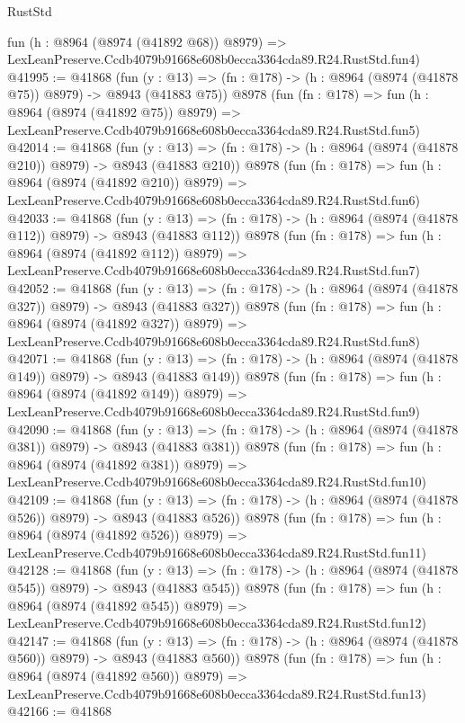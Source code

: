 \begin{lexlean}{RustStd}
\begin{coremodule}
    fun (h : @8964 (@8974 (@41892 @68)) @8979) =>
    LexLeanPreserve.Ccdb4079b91668e608b0ecca3364cda89.R24.RustStd.fun4)
@41995 := @41868
    (fun (y : @13) => (fn : @178) -> (h : @8964 (@8974 (@41878 @75)) @8979) -> @8943 (@41883 @75))
    @8978
    (fun (fn : @178) =>
    fun (h : @8964 (@8974 (@41892 @75)) @8979) =>
    LexLeanPreserve.Ccdb4079b91668e608b0ecca3364cda89.R24.RustStd.fun5)
@42014 := @41868
    (fun (y : @13) => (fn : @178) -> (h : @8964 (@8974 (@41878 @210)) @8979) -> @8943 (@41883 @210))
    @8978
    (fun (fn : @178) =>
    fun (h : @8964 (@8974 (@41892 @210)) @8979) =>
    LexLeanPreserve.Ccdb4079b91668e608b0ecca3364cda89.R24.RustStd.fun6)
@42033 := @41868
    (fun (y : @13) => (fn : @178) -> (h : @8964 (@8974 (@41878 @112)) @8979) -> @8943 (@41883 @112))
    @8978
    (fun (fn : @178) =>
    fun (h : @8964 (@8974 (@41892 @112)) @8979) =>
    LexLeanPreserve.Ccdb4079b91668e608b0ecca3364cda89.R24.RustStd.fun7)
@42052 := @41868
    (fun (y : @13) => (fn : @178) -> (h : @8964 (@8974 (@41878 @327)) @8979) -> @8943 (@41883 @327))
    @8978
    (fun (fn : @178) =>
    fun (h : @8964 (@8974 (@41892 @327)) @8979) =>
    LexLeanPreserve.Ccdb4079b91668e608b0ecca3364cda89.R24.RustStd.fun8)
@42071 := @41868
    (fun (y : @13) => (fn : @178) -> (h : @8964 (@8974 (@41878 @149)) @8979) -> @8943 (@41883 @149))
    @8978
    (fun (fn : @178) =>
    fun (h : @8964 (@8974 (@41892 @149)) @8979) =>
    LexLeanPreserve.Ccdb4079b91668e608b0ecca3364cda89.R24.RustStd.fun9)
@42090 := @41868
    (fun (y : @13) => (fn : @178) -> (h : @8964 (@8974 (@41878 @381)) @8979) -> @8943 (@41883 @381))
    @8978
    (fun (fn : @178) =>
    fun (h : @8964 (@8974 (@41892 @381)) @8979) =>
    LexLeanPreserve.Ccdb4079b91668e608b0ecca3364cda89.R24.RustStd.fun10)
@42109 := @41868
    (fun (y : @13) => (fn : @178) -> (h : @8964 (@8974 (@41878 @526)) @8979) -> @8943 (@41883 @526))
    @8978
    (fun (fn : @178) =>
    fun (h : @8964 (@8974 (@41892 @526)) @8979) =>
    LexLeanPreserve.Ccdb4079b91668e608b0ecca3364cda89.R24.RustStd.fun11)
@42128 := @41868
    (fun (y : @13) => (fn : @178) -> (h : @8964 (@8974 (@41878 @545)) @8979) -> @8943 (@41883 @545))
    @8978
    (fun (fn : @178) =>
    fun (h : @8964 (@8974 (@41892 @545)) @8979) =>
    LexLeanPreserve.Ccdb4079b91668e608b0ecca3364cda89.R24.RustStd.fun12)
@42147 := @41868
    (fun (y : @13) => (fn : @178) -> (h : @8964 (@8974 (@41878 @560)) @8979) -> @8943 (@41883 @560))
    @8978
    (fun (fn : @178) =>
    fun (h : @8964 (@8974 (@41892 @560)) @8979) =>
    LexLeanPreserve.Ccdb4079b91668e608b0ecca3364cda89.R24.RustStd.fun13)
@42166 := @41868

\end{coremodule}
\end{lexlean}
